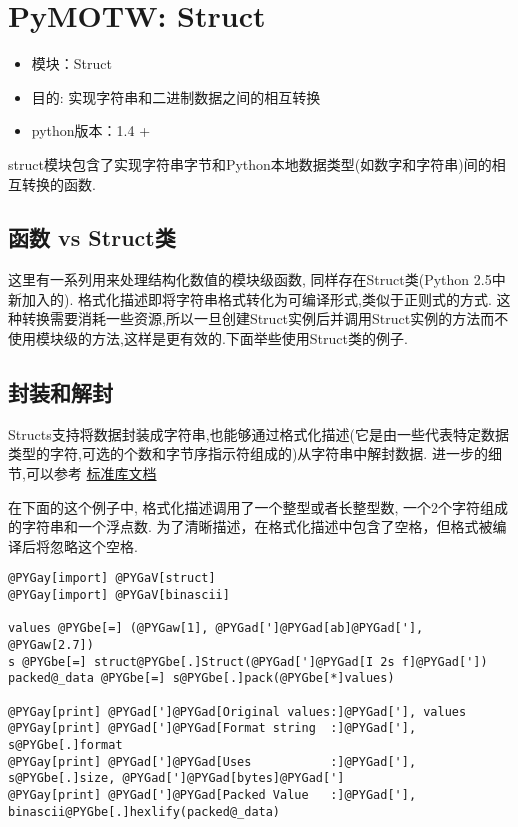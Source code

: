 \documentclass[a4paper,10pt,english]{manual}
\begin{document}
\clearpage
\section{PyMOTW: Struct}
\begin{itemize}
\item {} 
模块：Struct

\item {} 
目的: 实现字符串和二进制数据之间的相互转换

\item {} 
python版本：1.4 +

\end{itemize}

struct模块包含了实现字符串字节和Python本地数据类型(如数字和字符串)间的相互转换的函数.


\subsection{函数 vs Struct类}

这里有一系列用来处理结构化数值的模块级函数, 同样存在Struct类(Python 2.5中新加入的). 格式化描述即将字符串格式转化为可编译形式,类似于正则式的方式. 这种转换需要消耗一些资源,所以一旦创建Struct实例后并调用Struct实例的方法而不使用模块级的方法,这样是更有效的.下面举些使用Struct类的例子.


\subsection{封装和解封}

Structs支持将数据封装成字符串,也能够通过格式化描述(它是由一些代表特定数据类型的字符,可选的个数和字节序指示符组成的)从字符串中解封数据. 进一步的细节,可以参考 \href{http://docs.python.org/library/struct.html}{标准库文档}

在下面的这个例子中, 格式化描述调用了一个整型或者长整型数, 一个2个字符组成的字符串和一个浮点数. 为了清晰描述，在格式化描述中包含了空格，但格式被编译后将忽略这个空格.

\begin{Verbatim}[commandchars=@\[\]]
@PYGay[import] @PYGaV[struct]
@PYGay[import] @PYGaV[binascii]

values @PYGbe[=] (@PYGaw[1], @PYGad[']@PYGad[ab]@PYGad['], @PYGaw[2.7])
s @PYGbe[=] struct@PYGbe[.]Struct(@PYGad[']@PYGad[I 2s f]@PYGad['])
packed@_data @PYGbe[=] s@PYGbe[.]pack(@PYGbe[*]values)

@PYGay[print] @PYGad[']@PYGad[Original values:]@PYGad['], values
@PYGay[print] @PYGad[']@PYGad[Format string  :]@PYGad['], s@PYGbe[.]format
@PYGay[print] @PYGad[']@PYGad[Uses           :]@PYGad['], s@PYGbe[.]size, @PYGad[']@PYGad[bytes]@PYGad[']
@PYGay[print] @PYGad[']@PYGad[Packed Value   :]@PYGad['], binascii@PYGbe[.]hexlify(packed@_data)
\end{Verbatim}
\end{document}
